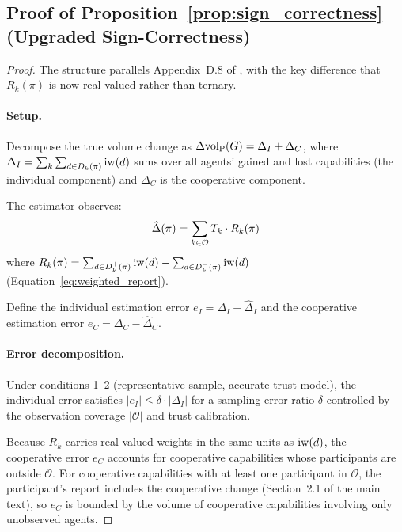 
\subsection{Proof of Proposition~\ref{prop:sign_correctness} (Upgraded Sign-Correctness)}
\label{app:proof_sign_correctness}

\begin{proof}
The structure parallels Appendix~D.8 of \citet{lasser2026gfm}, with the key
difference that $R_k(\pi)$ is now real-valued rather than ternary.

\paragraph{Setup.} Decompose the true volume change as
$\Delta {\operatorname{vol}_{\mathrm{P}}}(G) = \Delta_I + \Delta_C$, where
$\Delta_I = \sum_k \sum_{d \in D_k(\pi)} \operatorname{iw}(d)$ sums over all agents'
gained and lost capabilities (the individual component) and $\Delta_C$ is the
cooperative component.

The estimator observes:
\[
\hat{\Delta}(\pi) = \sum_{k \in \mathcal{O}} T_k \cdot R_k(\pi)
\]
where $R_k(\pi) = \sum_{d \in D_k^+(\pi)} \operatorname{iw}(d) - \sum_{d \in D_k^-(\pi)}
\operatorname{iw}(d)$ (Equation~\eqref{eq:weighted_report}).

Define the individual estimation error $e_I = \Delta_I - \hat{\Delta}_I$ and
the cooperative estimation error $e_C = \Delta_C - \hat{\Delta}_C$.

\paragraph{Error decomposition.} Under conditions 1--2 (representative sample,
accurate trust model), the individual error satisfies $|e_I| \leq \delta \cdot
|\Delta_I|$ for a sampling error ratio $\delta$ controlled by the
observation coverage $|\mathcal{O}|$ and trust calibration.

Because $R_k$ carries real-valued weights in the same units as $\operatorname{iw}(d)$, the
cooperative error $e_C$ accounts for cooperative capabilities whose
participants are outside $\mathcal{O}$. For cooperative capabilities with at
least one participant in $\mathcal{O}$, the participant's report includes the
cooperative change (Section~2.1 of the main text), so $e_C$ is bounded by the
volume of cooperative capabilities involving only unobserved agents.


\end{proof}
